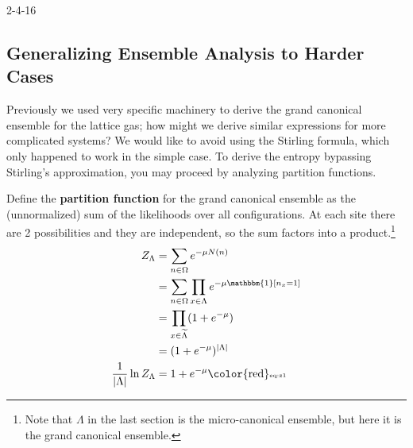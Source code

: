 
{\color{blue}2-4-16}

\subsection{Generalizing Ensemble Analysis to Harder Cases}

Previously we used very specific machinery to derive the grand canonical ensemble for the lattice gas; how might we derive similar expressions for more complicated systems?  We would like to avoid using the Stirling formula, which only happened to work in the simple case. 
To derive the entropy bypassing Stirling's approximation, you may proceed by analyzing partition functions. 

Define the \textbf{partition function} for the grand canonical ensemble as the (unnormalized) sum of the likelihoods over all configurations. At each site there are 2 possibilities and they are independent, so the sum factors into a product.\footnote{Note that $\Lambda$ in the last section is the micro-canonical ensemble, but here it is the grand canonical ensemble.}
\begin{align}
\nonumber
Z_\Lambda & = \sum_{n\in \Omega} e^{-\mu N(n)} \\
\nonumber
&=\sum_{n\in \Omega} \prod_{x\in \Lambda} e^{-\mu \mathbbm{1}[n_x=1]}\\
\nonumber
&=\prod_{x\in \widetilde{\Lambda}}(1+e^{-\mu})\\
\nonumber
&= (1+e^{-\mu})^{|\Lambda|}\\
\frac{1}{|\Lambda|} \ln Z_{\Lambda} &= 1+e^{-\mu}
\label{eq:z1}\text{{\color{red}\tiny eq:z1}}
\end{align}

